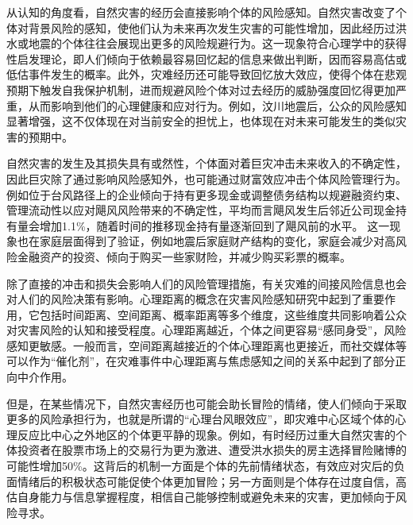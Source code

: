 从认知的角度看，自然灾害的经历会直接影响个体的风险感知。自然灾害改变了个体对背景风险的感知，使他们认为未来再次发生灾害的可能性增加\citep{dillenberger2015history,ZGRK202210006}，因此经历过洪水或地震的个体往往会展现出更多的风险规避行为\citep{cameron2015risk,cassar2017trust}。这一现象符合心理学中的获得性启发理论\citep{tversky1973availability,0Do}，即人们倾向于依赖最容易回忆起的信息来做出判断，因而容易高估或低估事件发生的概率。此外，灾难经历还可能导致回忆放大效应\citep{heir2009longitudinal,cheong2022natural}，使得个体在悲观预期下触发自我保护机制，进而规避风险个体对过去经历的威胁强度回忆得更加严重\citep{dillenberger2015history}，从而影响到他们的心理健康和应对行为。例如，汶川地震后，公众的风险感知显著增强，这不仅体现在对当前安全的担忧上，也体现在对未来可能发生的类似灾害的预期中\citep{李华强2009突发性灾害中的公众风险感知与应急管理,贾建民2008汶川地震重灾区与非重灾区民众风险感知对比分析}。

自然灾害的发生及其损失具有或然性，个体面对着巨灾冲击未来收入的不确定性，因此巨灾除了通过影响风险感知外，也可能通过财富效应冲击个体风险管理行为\citep{田玲2009中国财产保险业巨灾损失赔付能力实证研究}。例如位于台风路径上的企业倾向于持有更多现金\citep{0Do,杨娜娜2019自然灾害与企业现金持有}或调整债务结构\citep{shao2024typhoons}以规避融资约束、管理流动性以应对飓风风险带来的不确定性，平均而言飓风发生后邻近公司现金持有量会增加1.1\%，随着时间的推移现金持有量逐渐回到了飓风前的水平\citep{0Do}。
这一现象也在家庭层面得到了验证，例如地震后家庭财产结构的变化，家庭会减少对高风险金融资产的投资\citep{于也雯0财产和生命双重风险约束下的家庭资产选择,liu2022effect}、倾向于购买一些家财险，并减少购买彩票的概率\citep{章元0地震冲击对风险偏好的影响}。

除了直接的冲击和损失会影响人们的风险管理措施，有关灾难的间接风险信息也会对人们的风险决策有影响\citep{said2015risk}。心理距离的概念在灾害风险感知研究中起到了重要作用\citep{jin2013experimental}，它包括时间距离、空间距离、概率距离等多个维度，这些维度共同影响着公众对灾害风险的认知和接受程度\citep{尚志海2018基于心理距离的灾害可接受风险研究,mcdonald2015personal}。心理距离越近，个体之间更容易“感同身受”，风险感知更敏感\citep{尚志海2019基于心理距离的公众台风灾害风险感知比较分析,FZJS202102009}。一般而言，空间距离越接近的个体心理距离也更接近\citep{zhang2009psychological}，而社交媒体等可以作为“催化剂”，在灾难事件中心理距离与焦虑感知之间的关系中起到了部分正向中介作用\citep{FJSX202203012}。

但是，在某些情况下，自然灾害经历也可能会助长冒险的情绪，使人们倾向于采取更多的风险承担行为，也就是所谓的“心理台风眼效应”，即灾难中心区域个体的心理反应比中心之外地区的个体更平静的现象\citep{谢晓非2012心理台风眼效应研究综述}。例如，有时经历过重大自然灾害的个体投资者在股票市场上的交易行为更为激进\citep{bui2019natural}、遭受洪水损失的房主选择冒险赌博的可能性增加50\%\citep{page2012variation}。这背后的机制一方面是个体的先前情绪状态，有效应对灾后的负面情绪后的积极状态可能促使个体更加冒险\citep{bonanno2004loss}；另一方面则是个体存在过度自信，高估自身能力与信息掌握程度，相信自己能够控制或避免未来的灾害，更加倾向于风险寻求\citep{王大伟2014先前情绪和过度自信对灾难事件后继风险决策的影响,ahmed2013managerial}。

